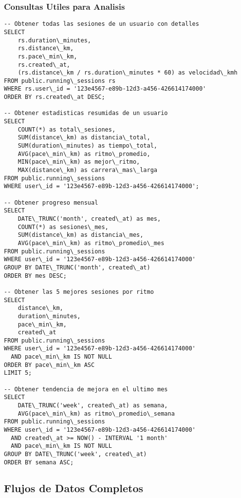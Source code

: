 \documentclass[12pt,a4paper]{article}
\begin{document}
\subsubsection{Consultas Utiles para Analisis}

\begin{lstlisting}[caption=Consultas utiles para analisis de running]
-- Obtener todas las sesiones de un usuario con detalles
SELECT 
    rs.duration\_minutes,
    rs.distance\_km,
    rs.pace\_min\_km,
    rs.created\_at,
    (rs.distance\_km / rs.duration\_minutes * 60) as velocidad\_kmh
FROM public.running\_sessions rs
WHERE rs.user\_id = '123e4567-e89b-12d3-a456-426614174000'
ORDER BY rs.created\_at DESC;

-- Obtener estadisticas resumidas de un usuario
SELECT 
    COUNT(*) as total\_sesiones,
    SUM(distance\_km) as distancia\_total,
    SUM(duration\_minutes) as tiempo\_total,
    AVG(pace\_min\_km) as ritmo\_promedio,
    MIN(pace\_min\_km) as mejor\_ritmo,
    MAX(distance\_km) as carrera\_mas\_larga
FROM public.running\_sessions
WHERE user\_id = '123e4567-e89b-12d3-a456-426614174000';

-- Obtener progreso mensual
SELECT 
    DATE\_TRUNC('month', created\_at) as mes,
    COUNT(*) as sesiones\_mes,
    SUM(distance\_km) as distancia\_mes,
    AVG(pace\_min\_km) as ritmo\_promedio\_mes
FROM public.running\_sessions
WHERE user\_id = '123e4567-e89b-12d3-a456-426614174000'
GROUP BY DATE\_TRUNC('month', created\_at)
ORDER BY mes DESC;

-- Obtener las 5 mejores sesiones por ritmo
SELECT 
    distance\_km,
    duration\_minutes,
    pace\_min\_km,
    created\_at
FROM public.running\_sessions
WHERE user\_id = '123e4567-e89b-12d3-a456-426614174000'
  AND pace\_min\_km IS NOT NULL
ORDER BY pace\_min\_km ASC
LIMIT 5;

-- Obtener tendencia de mejora en el ultimo mes
SELECT 
    DATE\_TRUNC('week', created\_at) as semana,
    AVG(pace\_min\_km) as ritmo\_promedio\_semana
FROM public.running\_sessions
WHERE user\_id = '123e4567-e89b-12d3-a456-426614174000'
  AND created\_at >= NOW() - INTERVAL '1 month'
  AND pace\_min\_km IS NOT NULL
GROUP BY DATE\_TRUNC('week', created\_at)
ORDER BY semana ASC;
\end{lstlisting}

\subsection{Flujos de Datos Completos}
\end{document}
